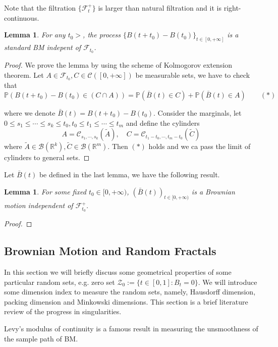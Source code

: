 \documentclass[11pt,english]{smfart}
\newtheorem{lemma}[theorem]{Lemma}
\newcommand{\mb}{\mathbb}
\newcommand{\mc}{\mathcal}
\begin{document}
Note that the filtration $\{\mc{F}^+_t\}$ is larger than natural filtration and it is right-continuous. \\

\begin{lemma}
    For any $t_0 > $, the process $\{B(t+t_0) - B(t_0)\}_{t\in [0,+\infty]}$ is a standard BM indepent of $\mc{F}_{t_0}$. 
\end{lemma}

\begin{proof}
    We prove the lemma by using the scheme of Kolmogorov extension theorem. Let $A \in \mc{F}_{t_0},C\in \mc{C}([0,+\infty])$ be measurable sets, we have to check that $$\mb{P}(B(t+ t_0 ) - B(t_0)\in (C\cap A)) = \mb{P}(\bar{B}(t) \in C) + \mb{P} (\bar{B}(t) \in A) \quad \quad (*)$$

    where we denote $\bar{B} (t) = B(t+t_0) - B(t_0). $ Consider the marginals, let $0 \leq s_1 \leq \cdots \leq s_k \leq t_0, t_0 \leq t_1 \leq \cdots \leq t_m$ and define the cylinders $$A = \mc{C}_{s_1,\cdots, s_k}(\tilde{A}),\quad C = \mc{C}_{t_1 - t_0,\cdots, t_m -t_0}(\tilde{C})$$
    where $\tilde{A} \in \mc{B}(\mb{R}^k), \tilde{C} \in \mc{B}(\mb{R}^m)$. Then $(*)$ holds and we ca pass the limit of cylinders to general sets.
\end{proof}

Let $\bar{B}(t)$ be defined in the last lemma, we have the following result. \\
\begin{lemma}
    For some fixed $t_0\in [0,+\infty)$, $(\bar{B}(t))_{t\in [0,+\infty)}$ is a Brownian motion independent of $\mc{F}_{t_0}^+$. 
\end{lemma}

\begin{proof}
    
\end{proof}

\subsection{Brownian Motion and Random Fractals}
In this section we will briefly discuss some geometrical properties of some particular random sets, e.g. zero set $\mathcal{Z}_0 := \{t\in [0,1]: B_t = 0\}$. We will introduce some dimension index to measure the random sets, namely, Hausdorff dimension, packing dimension and Minkowski dimensions. This section is a brief literature review of the progress in singularities. 

Levy's modulus of continuity is a famous result in measuring the unsmoothness of the sample path of BM. \\
\end{document}
